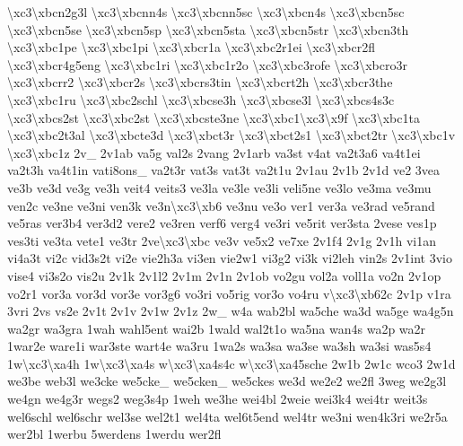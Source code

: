 \begin{DoxyCompactItemize}
\textbackslash{}xc3\textbackslash{}xbcn2g3l \textbackslash{}xc3\textbackslash{}xbcnn4s \textbackslash{}xc3\textbackslash{}xbcnn5sc \textbackslash{}xc3\textbackslash{}xbcn4s \textbackslash{}xc3\textbackslash{}xbcn5sc \textbackslash{}xc3\textbackslash{}xbcn5se \textbackslash{}xc3\textbackslash{}xbcn5sp \textbackslash{}xc3\textbackslash{}xbcn5sta \textbackslash{}xc3\textbackslash{}xbcn5str \textbackslash{}xc3\textbackslash{}xbcn3th \textbackslash{}xc3\textbackslash{}xbc1pe \textbackslash{}xc3\textbackslash{}xbc1pi \textbackslash{}xc3\textbackslash{}xbcr1a \textbackslash{}xc3\textbackslash{}xbc2r1ei \textbackslash{}xc3\textbackslash{}xbcr2fl \textbackslash{}xc3\textbackslash{}xbcr4g5eng \textbackslash{}xc3\textbackslash{}xbc1ri \textbackslash{}xc3\textbackslash{}xbc1r2o \textbackslash{}xc3\textbackslash{}xbc3rofe \textbackslash{}xc3\textbackslash{}xbcro3r \textbackslash{}xc3\textbackslash{}xbcrr2 \textbackslash{}xc3\textbackslash{}xbcr2s \textbackslash{}xc3\textbackslash{}xbcrs3tin \textbackslash{}xc3\textbackslash{}xbcrt2h \textbackslash{}xc3\textbackslash{}xbcr3the \textbackslash{}xc3\textbackslash{}xbc1ru \textbackslash{}xc3\textbackslash{}xbc2schl \textbackslash{}xc3\textbackslash{}xbcse3h \textbackslash{}xc3\textbackslash{}xbcse3l \textbackslash{}xc3\textbackslash{}xbcs4s3c \textbackslash{}xc3\textbackslash{}xbcs2st \textbackslash{}xc3\textbackslash{}xbc2st \textbackslash{}xc3\textbackslash{}xbcste3ne \textbackslash{}xc3\textbackslash{}xbc1\textbackslash{}xc3\textbackslash{}x9f \textbackslash{}xc3\textbackslash{}xbc1ta \textbackslash{}xc3\textbackslash{}xbc2t3al \textbackslash{}xc3\textbackslash{}xbcte3d \textbackslash{}xc3\textbackslash{}xbct3r \textbackslash{}xc3\textbackslash{}xbct2s1 \textbackslash{}xc3\textbackslash{}xbct2tr \textbackslash{}xc3\textbackslash{}xbc1v \textbackslash{}xc3\textbackslash{}xbc1z 2v\-\_\- 2v1ab va5g val2s 2vang 2v1arb va3st v4at va2t3a6 va4t1ei va2t3h va4t1in vati8ons\-\_\- va2t3r vat3s vat3t va2t1u 2v1au 2v1b 2v1d ve2 3vea ve3b ve3d ve3g ve3h veit4 veits3 ve3la ve3le ve3li veli5ne ve3lo ve3ma ve3mu ven2c ve3ne ve3ni ven3k ve3n\textbackslash{}xc3\textbackslash{}xb6 ve3nu ve3o ver1 ver3a ve3rad ve5rand ve5ras ver3b4 ver3d2 vere2 ve3ren verf6 verg4 ve3ri ve5rit ver3sta 2vese ves1p ves3ti ve3ta vete1 ve3tr 2ve\textbackslash{}xc3\textbackslash{}xbc ve3v ve5x2 ve7xe 2v1f4 2v1g 2v1h vi1an vi4a3t vi2c vid3s2t vi2e vie2h3a vi3en vie2w1 vi3g2 vi3k vi2leh vin2s 2v1int 3vio vise4 vi3s2o vis2u 2v1k 2v1l2 2v1m 2v1n 2v1ob vo2gu vol2a voll1a vo2n 2v1op vo2r1 vor3a vor3d vor3e vor3g6 vo3ri vo5rig vor3o vo4ru v\textbackslash{}xc3\textbackslash{}xb62c 2v1p v1ra 3vri 2vs vs2e 2v1t 2v1v 2v1w 2v1z 2w\-\_\- w4a wab2bl wa5che wa3d wa5ge wa4g5n wa2gr wa3gra 1wah wahl5ent wai2b 1wald wal2t1o wa5na wan4s wa2p wa2r 1war2e ware1i war3ste wart4e wa3ru 1wa2s wa3sa wa3se wa3sh wa3si was5s4 1w\textbackslash{}xc3\textbackslash{}xa4h 1w\textbackslash{}xc3\textbackslash{}xa4s w\textbackslash{}xc3\textbackslash{}xa4s4c w\textbackslash{}xc3\textbackslash{}xa45sche 2w1b 2w1c wco3 2w1d we3be web3l we3cke we5cke\-\_\- we5cken\-\_\- we5ckes we3d we2e2 we2fl 3weg we2g3l we4gn we4g3r wegs2 weg3s4p 1weh we3he wei4bl 2weie wei3k4 wei4tr weit3s wel6schl wel6schr wel3se wel2t1 wel4ta wel6t5end wel4tr we3ni wen4k3ri we2r5a wer2bl 1werbu 5werdens 1werdu wer2fl 
\end{DoxyCompactItemize}
